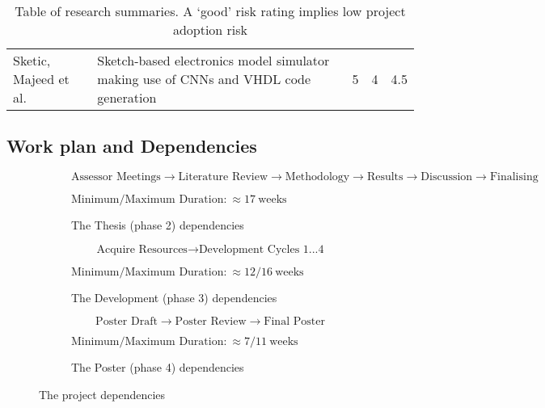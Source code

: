 \documentclass{article}
\begin{document}
\begin{table}[htpb]
\begin{tabular}{
    @{}
    l
    >{\raggedright\arraybackslash}p{7cm}
    l
    l
    l
    @{}
    }
    Sketic, Majeed et al. \cite{191016}                     & 
    Sketch-based electronics model simulator making use of
    \gls{CNN}s and VHDL code generation                     & 5         & 4    & 4.5   \\
  \end{tabular}
  \caption[Table of research summaries]{
    Table of research summaries. A `good' risk rating implies low project adoption risk}
  \label{tab:Table of research summaries}
\end{table}

\subsection{Work plan and Dependencies}
\label{subsec:Work plan and Dependencies}

\begin{figure}[hptb]
  \begin{subfigure}{\textwidth}
    
    \centering
    $$
      \text{Assessor Meetings}\rightarrow
      \text{Literature Review}\rightarrow
      \text{Methodology}\rightarrow
      \text{Results}\rightarrow
      \text{Discussion}\rightarrow
      \text{Finalising}
    $$
    
    $\text{Minimum/Maximum Duration:}~\approx17~\text{weeks}$
    
    \caption{The Thesis (phase 2) dependencies}
    \label{fig:The Thesis (phase 2) dependencies}
  \end{subfigure}
  
  \begin{subfigure}[b]{0.45\textwidth}
    
    \centering
    $$
      \text{Acquire Resources}\rightarrow
      \text{Development Cycles 1...4}
    $$
    
    $\text{Minimum/Maximum Duration:}~\approx12/16~\text{weeks}$
    
    \caption{The Development (phase 3) dependencies}
    \label{fig:The Development (phase 3) dependencies}
  \end{subfigure}
  \hfill
  \begin{subfigure}[b]{0.45\textwidth}
    
    \centering
    $$
      \text{Poster Draft}\rightarrow
      \text{Poster Review}\rightarrow
      \text{Final Poster}
    $$
    
    $\text{Minimum/Maximum Duration:}~\approx7/11~\text{weeks}$
    
    \caption{The Poster (phase 4) dependencies}
    \label{fig:The Poster (phase 4) dependencies}
  \end{subfigure}
  
  \caption{The project dependencies}
  \label{fig:The project dependencies}
\end{figure}
\end{document}
